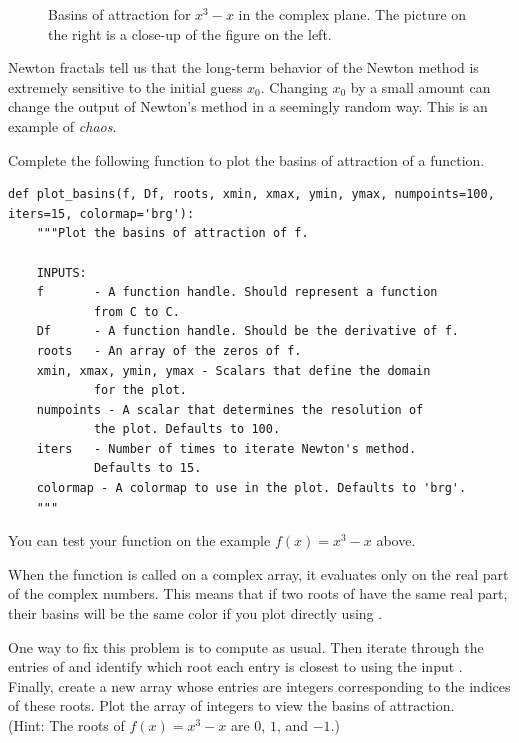 \begin{figure}
\begin{center}
\begin{subfigure}[b]{.49\textwidth}
\end{subfigure}
\caption{ Basins of attraction for $x^3-x$ in the complex plane.
The picture on the right is a close-up of the figure on the left.}
\label{fig:fractal_ex}
\end{center}
\end{figure}

Newton fractals tell us that the long-term behavior of the Newton method is extremely sensitive to the initial guess $x_0$.
Changing $x_0$ by a small amount can change the output of Newton's method in a seemingly random way.
This is an example of \emph{chaos}.

\begin{problem}
Complete the following function to plot the basins of attraction of a function.

\begin{lstlisting}
def plot_basins(f, Df, roots, xmin, xmax, ymin, ymax, numpoints=100, iters=15, colormap='brg'):
    """Plot the basins of attraction of f.

    INPUTS:
    f       - A function handle. Should represent a function
            from C to C.
    Df      - A function handle. Should be the derivative of f.
    roots   - An array of the zeros of f.
    xmin, xmax, ymin, ymax - Scalars that define the domain
            for the plot.
    numpoints - A scalar that determines the resolution of
            the plot. Defaults to 100.
    iters   - Number of times to iterate Newton's method.
            Defaults to 15.
    colormap - A colormap to use in the plot. Defaults to 'brg'.
    """
\end{lstlisting}

You can test your function on the example $f(x) = x^3-x$ above.

When the function  is called on a complex array, it evaluates only on the real part of the complex numbers.
This means that if two roots of  have the same real part, their basins will be the same color if you plot directly using .

One way to fix this problem is to compute  as usual.
Then iterate through the entries of  and identify which root each entry is closest to using the input .
Finally, create a new array whose entries are integers corresponding to the indices of these roots.
Plot the array of integers to view the basins of attraction.
\\ (Hint: The roots of $f(x) = x^3-x$ are $0$, $1$, and $-1$.)
\end{problem}

